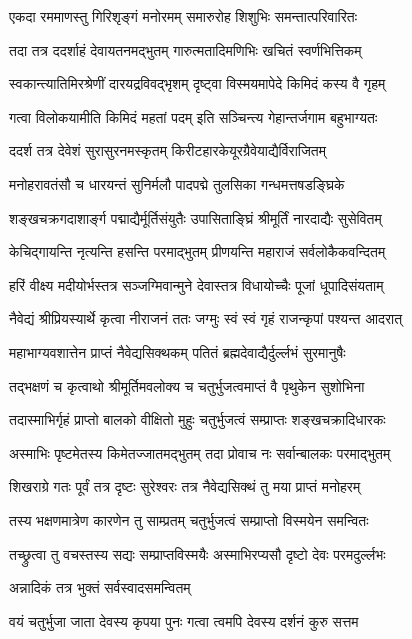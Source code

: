 \twolineshloka
{एकदा रममाणस्तु गिरिशृङ्गं मनोरमम्}
{समारुरोह शिशुभिः समन्तात्परिवारितः}%

\twolineshloka
{तदा तत्र ददर्शाहं देवायतनमद्भुतम्}
{गारुत्मतादिमणिभिः खचितं स्वर्णभित्तिकम्}%

\twolineshloka
{स्वकान्त्यातिमिरश्रेणीं दारयद्रविवद्भृशम्}
{दृष्ट्वा विस्मयमापेदे किमिदं कस्य वै गृहम्}%

\twolineshloka
{गत्वा विलोकयामीति किमिदं महतां पदम्}
{इति सञ्चिन्त्य गेहान्तर्जगाम बहुभाग्यतः}%

\twolineshloka
{ददर्श तत्र देवेशं सुरासुरनमस्कृतम्}
{किरीटहारकेयूरग्रैवेयाद्यैर्विराजितम्}%

\twolineshloka
{मनोहरावतंसौ च धारयन्तं सुनिर्मलौ}
{पादपद्मे तुलसिका गन्धमत्तषडङ्घ्रिके}%

\twolineshloka
{शङ्खचक्रगदाशार्ङ्ग पद्माद्यैर्मूर्तिसंयुतैः}
{उपासिताङ्घ्रिं श्रीमूर्तिं नारदाद्यैः सुसेवितम्}%

\twolineshloka
{केचिद्गायन्ति नृत्यन्ति हसन्ति परमाद्भुतम्}
{प्रीणयन्ति महाराजं सर्वलोकैकवन्दितम्}%

\twolineshloka
{हरिं वीक्ष्य मदीयोर्भस्तत्र सञ्जग्मिवान्मुने}
{देवास्तत्र विधायोच्चैः पूजां धूपादिसंयताम्}%

\twolineshloka
{नैवेद्यं श्रीप्रियस्यार्थे कृत्वा नीराजनं ततः}
{जग्मुः स्वं स्वं गृहं राजन्कृपां पश्यन्त आदरात्}%

\twolineshloka
{महाभाग्यवशात्तेन प्राप्तं नैवेद्यसिक्थकम्}
{पतितं ब्रह्मदेवाद्यैर्दुर्ल्लभं सुरमानुषैः}%

\twolineshloka
{तद्भक्षणं च कृत्वाथो श्रीमूर्तिमवलोक्य च}
{चतुर्भुजत्वमाप्तं वै पृथुकेन सुशोभिना}%

\twolineshloka
{तदास्माभिर्गृहं प्राप्तो बालको वीक्षितो मुहुः}
{चतुर्भुजत्वं सम्प्राप्तः शङ्खचक्रादिधारकः}%

\twolineshloka
{अस्माभिः पृष्टमेतस्य किमेतज्जातमद्भुतम्}
{तदा प्रोवाच नः सर्वान्बालकः परमाद्भुतम्}%

\twolineshloka
{शिखराग्रे गतः पूर्वं तत्र दृष्टः सुरेश्वरः}
{तत्र नैवेद्यसिक्थं तु मया प्राप्तं मनोहरम्}%

\twolineshloka
{तस्य भक्षणमात्रेण कारणेन तु साम्प्रतम्}
{चतुर्भुजत्वं सम्प्राप्तो विस्मयेन समन्वितः}%

\twolineshloka
{तच्छ्रुत्वा तु वचस्तस्य सद्यः सम्प्राप्तविस्मयैः}
{अस्माभिरप्यसौ दृष्टो देवः परमदुर्ल्लभः}%

अन्नादिकं तत्र भुक्तं सर्वस्वादसमन्वितम्

\twolineshloka
{वयं चतुर्भुजा जाता देवस्य कृपया पुनः}
{गत्वा त्वमपि देवस्य दर्शनं कुरु सत्तम}%

